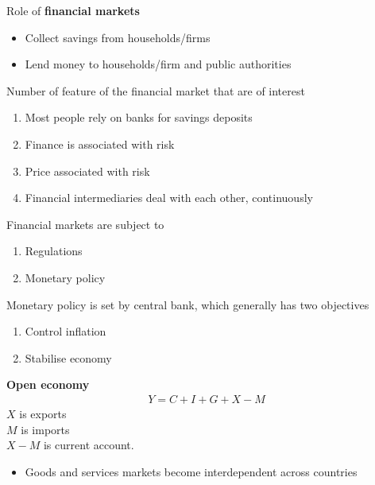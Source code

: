 \documentclass{beamer}
\begin{document}
\begin{frame}
  Role of \textbf{financial markets}
  \begin{itemize}
     \item Collect savings from households/firms
     \item Lend money to households/firm and public authorities
   \end{itemize} 
   \medskip
   Number of feature of the financial market that are of interest
  \begin{enumerate}
    \item Most people rely on banks for savings deposits
    \item Finance is associated with risk
    \item Price associated with risk
    \item Financial intermediaries deal with each other, continuously    
  \end{enumerate}
\end{frame}

\begin{frame}
  Financial markets are subject to 
  \begin{enumerate}
    \item Regulations
    \item Monetary policy
  \end{enumerate}
  \medskip
  Monetary policy is set by central bank, which generally has two objectives
  \medskip
  \begin{enumerate}
    \item Control inflation
    \item Stabilise economy
  \end{enumerate}  
\end{frame}

\begin{frame}
  \textbf{Open economy}  
  \begin{align}
    Y=C+I+G+X-M
  \end{align}
  $X$ is exports\\
  $M$ is imports\\
  $X-M$ is current account.  
  \medskip
  \begin{itemize}
    \item Goods and services markets become interdependent across countries
  \end{itemize}
\end{frame}
\end{document}
